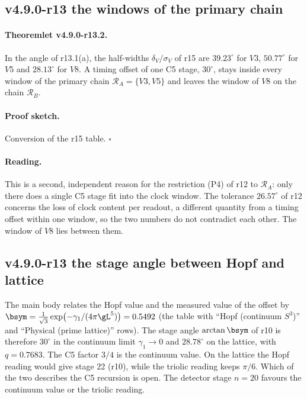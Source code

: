 \subsection*{v4.9.0-r13 the windows of the primary chain}
\label{subsec:v490-r13-windows}

\paragraph{Theoremlet v4.9.0-r13.2.}
In the angle of r13.1(a), the half-widths \(\delta_V/\sigma_V\) of r15 are \(39.23^\circ\) for \(V3\), \(50.77^\circ\) for \(V5\)
and \(28.13^\circ\) for \(V8\).  A timing offset of one C5 stage, \(30^\circ\), stays inside every window of the primary chain
\(\mathcal R_A=\{V3,V5\}\) and leaves the window of \(V8\) on the chain \(\mathcal R_B\).

\paragraph{Proof sketch.}
Conversion of the r15 table.  \(\square\)

\paragraph{Reading.}
This is a second, independent reason for the restriction (P4) of r12 to \(\mathcal R_A\): only there does a single C5 stage
fit into the clock window.  The tolerance \(26.57^\circ\) of r12 concerns the loss of clock content per readout, a different
quantity from a timing offset within one window, so the two numbers do not contradict each other.  The window of \(V8\)
lies between them.

\subsection*{v4.9.0-r13 the stage angle between Hopf and lattice}
\label{subsec:v490-r13-hopf-lattice}

The main body relates the Hopf value and the measured value of the offset by
\(\bsym=\tfrac1{\sqrt3}\exp\bigl(-\gamma_1/(4\pi\gL^5)\bigr)=0.5492\) (the table with ``Hopf (continuum \(S^3\))'' and
``Physical (prime lattice)'' rows).  The stage angle \(\arctan\bsym\) of r10 is therefore \(30^\circ\) in the continuum limit
\(\gamma_1\to0\) and \(28.78^\circ\) on the lattice, with \(q=0.7683\).  The C5 factor \(3/4\) is the continuum value.  On the
lattice the Hopf reading would give stage \(22\) (r10), while the triolic reading keeps \(\pi/6\).  Which of the two describes
the C5 recursion is open.  The detector stage \(n=20\) favours the continuum value or the triolic reading.

